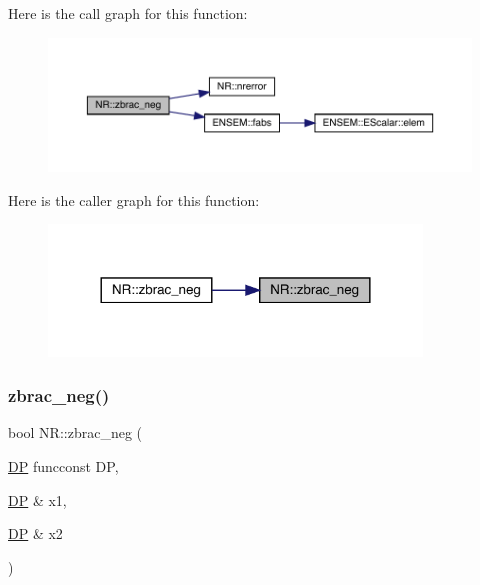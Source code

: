 Here is the call graph for this function\+:
\nopagebreak
\begin{figure}[H]
\begin{center}
\leavevmode
\includegraphics[width=350pt]{da/d46/namespaceNR_a4f88ac71576d19d1bb1e167e6f5b1bdc_cgraph}
\end{center}
\end{figure}
Here is the caller graph for this function\+:
\nopagebreak
\begin{figure}[H]
\begin{center}
\leavevmode
\includegraphics[width=281pt]{da/d46/namespaceNR_a4f88ac71576d19d1bb1e167e6f5b1bdc_icgraph}
\end{center}
\end{figure}
\mbox{\label{namespaceNR_ae680e6f764b658f8a61651eb172b4cab}} 
\subsubsection{\texorpdfstring{zbrac\_neg()}{zbrac\_neg()}\hspace{0.1cm}{\footnotesize\ttfamily [2/2]}}
{\footnotesize\ttfamily bool N\+R\+::zbrac\+\_\+neg (\begin{DoxyParamCaption}\item[{\mbox{\hyperlink{namespaceNR_af6ff762dd605ff477b8e52387253a02a}{DP}} }]{funcconst DP,  }\item[{\mbox{\hyperlink{namespaceNR_af6ff762dd605ff477b8e52387253a02a}{DP}} \&}]{x1,  }\item[{\mbox{\hyperlink{namespaceNR_af6ff762dd605ff477b8e52387253a02a}{DP}} \&}]{x2 }\end{DoxyParamCaption})}

